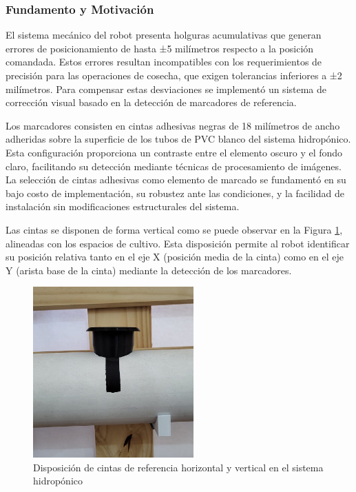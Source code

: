 \subsubsection{Fundamento y Motivación}

El sistema mecánico del robot presenta holguras acumulativas que generan errores de posicionamiento de hasta ±5 milímetros respecto a la posición comandada. Estos errores resultan incompatibles con los requerimientos de precisión para las operaciones de cosecha, que exigen tolerancias inferiores a ±2 milímetros. Para compensar estas desviaciones se implementó un sistema de corrección visual basado en la detección de marcadores de referencia.

Los marcadores consisten en cintas adhesivas negras de 18 milímetros de ancho adheridas sobre la superficie de los tubos de PVC blanco del sistema hidropónico. Esta configuración proporciona un contraste entre el elemento oscuro y el fondo claro, facilitando su detección mediante técnicas de procesamiento de imágenes. La selección de cintas adhesivas como elemento de marcado se fundamentó en su bajo costo de implementación, su robustez ante las condiciones, y la facilidad de instalación sin modificaciones estructurales del sistema.

Las cintas se disponen de forma vertical como se puede observar en la Figura \ref{fig:configuracion_cintas}, alineadas con los espacios de cultivo. Esta disposición permite al robot identificar su posición relativa tanto en el eje X (posición media de la cinta) como en el eje Y (arista base de la cinta) mediante la detección de los marcadores.

\begin{figure}[h]
\centering
\includegraphics[width=0.55\textwidth]{imagenes/configuracion_cintas_referencia.jpg}
\caption{Disposición de cintas de referencia horizontal y vertical en el sistema hidropónico}
\label{fig:configuracion_cintas}
\end{figure}

